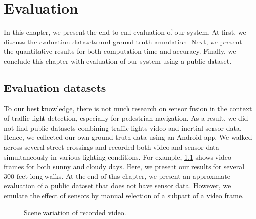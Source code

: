\chapter{Evaluation}
\label{c:evalu}

In this chapter, we present the end-to-end evaluation of our system.
At first, we discuss the evaluation datasets and ground truth annotation.
Next, we present the quantitative results for both computation time and accuracy.
Finally, we conclude this chapter with evaluation of our system using a public dataset.

\section{Evaluation datasets}
\label{s:eval}
To our best knowledge, there is not much research on sensor fusion in the context of traffic light detection, especially for pedestrian navigation. 
As a result, we did not find public datasets combining traffic lights video and inertial sensor data. 
Hence, we collected our own ground truth data using an Android app.
We walked across several street crossings and recorded both video and sensor data simultaneously in various lighting conditions. 
For example, \ref{f:dataset} shows video frames for both sunny and cloudy days. 
Here, we present our results for several 300 feet long walks.  
At the end of this chapter, we present an approximate evaluation of a public dataset that does not have sensor data. 
However, we emulate the effect of sensors by manual selection of a subpart of a video frame. 

\begin{figure}[!ht]
\centering
{}
\hfill
{}
\caption{Scene variation of recorded video.}
\label{f:dataset}
\end{figure}


